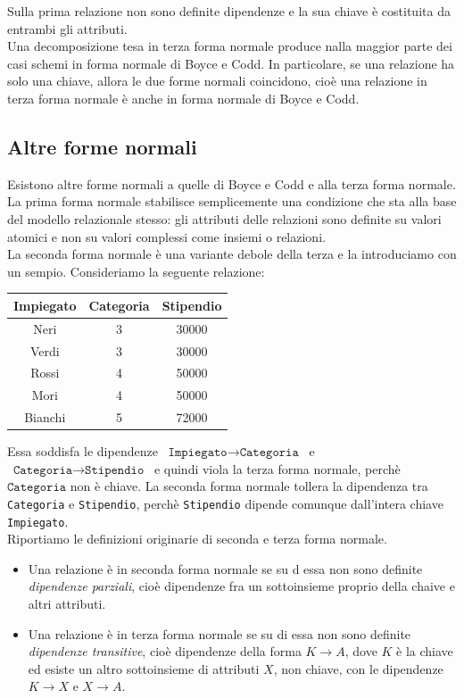 \documentclass[12pt]{report}
\begin{document}
	Sulla prima relazione non sono definite dipendenze e la sua chiave è costituita da entrambi gli attributi. \\
	Una decomposizione tesa in terza forma normale produce nalla maggior parte dei casi schemi in forma normale di Boyce e Codd. In particolare, se una relazione ha solo una chiave, allora le due forme normali coincidono, cioè una relazione in terza forma normale è anche in forma normale di Boyce e Codd.
	\subsection{Altre forme normali}
	Esistono altre forme normali a quelle di Boyce e Codd e alla terza forma normale. La prima forma normale stabilisce semplicemente una condizione che sta alla base del modello relazionale stesso: gli attributi delle relazioni sono definite su valori atomici e non su valori complessi come insiemi o relazioni. \\
	La seconda forma normale è una variante debole della terza e la introduciamo con un sempio. Consideriamo la seguente relazione:
	\begin{center}
		\begin{tabular}{|c|c|c|}
			\hline
			Impiegato & Categoria & Stipendio \\
			\hline
			Neri & 3 & 30000 \\
			Verdi & 3 & 30000 \\
			Rossi & 4 & 50000 \\
			Mori & 4 & 50000 \\
			Bianchi & 5 & 72000 \\
			\hline
		\end{tabular}
	\end{center}
	Essa soddisfa le dipendenze $\ \texttt{Impiegato} \to \texttt{Categoria}\ $ e $\ \texttt{Categoria} \to \texttt{Stipendio} \ $ e quindi viola la terza forma normale, perchè $\texttt{Categoria}$ non è chiave. La seconda forma normale tollera la dipendenza tra \texttt{Categoria} e \texttt{Stipendio}, perchè \texttt{Stipendio} dipende comunque dall'intera chiave \texttt{Impiegato}. \\
	Riportiamo le definizioni originarie di seconda e terza forma normale.
	\begin{itemize}
		\item Una relazione è in seconda forma normale se su d essa non sono definite \textit{dipendenze parziali}, cioè dipendenze fra un sottoinsieme proprio della chaive e altri attributi.
		\item Una relazione è in terza forma normale se su di essa non sono definite \textit{dipendenze transitive}, cioè dipendenze della forma $K \to A$, dove $K$ è la chiave ed esiste un altro sottoinsieme di attributi $X$, non chiave, con le dipendenze $K \to X$ e $X \to A$.
	\end{itemize}
\end{document}
